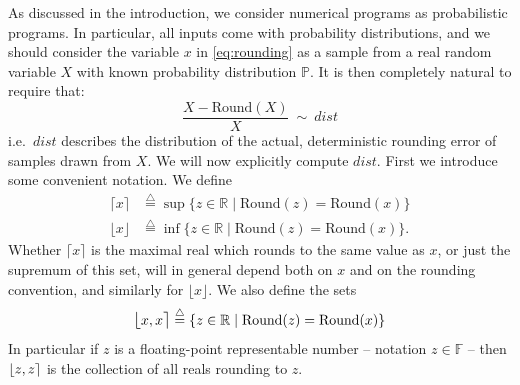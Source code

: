 \documentclass[10pt,conference]{IEEEtran}
\newcommand{\ie}{i.e.\ }
\newcommand{\round}{\mathrm{Round}}
\newcommand{\ceil}[1]{\lceil #1 \rceil}
\newcommand{\floor}[1]{\lfloor #1 \rfloor}
\newcommand{\fintvl}[1][x]{\mathlarger{\lfloor}#1,#1\mathlarger{\rceil}}
\newcommand{\F}{\mathbb{F}}
\newcommand{\R}{\mathbb{R}}
\begin{document}
As discussed in the introduction, we consider numerical programs as probabilistic programs. In particular, all inputs come with probability distributions, and we should consider the variable $x$ in \cref{eq:rounding} as a sample from a real random variable $X$ with known probability distribution $\mathbb{P}$. It is then completely natural to require that:
\[
\frac{X-\round(X)}{X}~\sim~dist
\]
\ie $dist$ describes the distribution of the actual, deterministic rounding error of samples drawn from $X$. We will now explicitly compute $dist$. First we introduce some convenient notation. We define
\begin{align*}
\ceil{x}&\stackrel{\triangle}{=}\sup\{z\in\R\mid \round(z)=\round(x)\}\\
\floor{x}&\stackrel{\triangle}{=}\inf\{z\in\R\mid \round(z)=\round(x)\}.
\end{align*}
Whether $\ceil{x}$ is the maximal real which rounds to the same value as $x$, or just the supremum of this set, will in general depend both on $x$ and on the rounding convention, and similarly for $\floor{x}$. We also define the sets 
\[
\fintvl\stackrel{\triangle}{=}\left\{z\in\R\mid \round(z)=\round(x)\right\}
\]  
In particular if $z$ is a floating-point representable number -- notation $z\in\F$ -- then $\fintvl[z]$ is the collection of all reals rounding to $z$.
\end{document}
